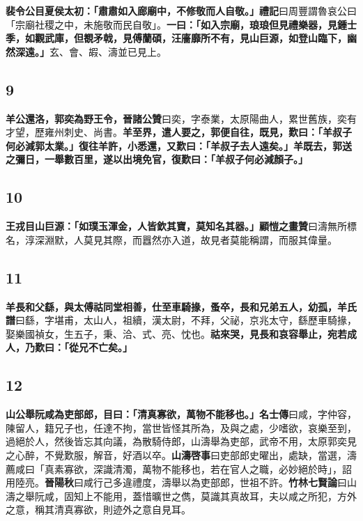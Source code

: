 \textbf{裴令公目夏侯太初：「肅肅如入廊廟中，不修敬而人自敬。」}{\footnotesize \textbf{禮記}曰周豐謂魯哀公曰「宗廟社稷之中，未施敬而民自敬」。}\textbf{一曰：「如入宗廟，琅琅但見禮樂器，見鍾士季，如觀武庫，但覩矛戟，見傅蘭碩，汪廧靡所不有，見山巨源，如登山臨下，幽然深遠。」}{\footnotesize 玄、會、嘏、濤並已見上。}

\subsection*{9}

\textbf{羊公還洛，郭奕為野王令，}{\footnotesize \textbf{晉諸公贊}曰奕，字泰業，太原陽曲人，累世舊族，奕有才望，歷雍州刺史、尚書。}\textbf{羊至界，遣人要之，郭便自往，既見，歎曰：「羊叔子何必減郭太業。」復往羊許，小悉還，又歎曰：「羊叔子去人遠矣。」羊既去，郭送之彌日，一舉數百里，遂以出境免官，復歎曰：「羊叔子何必減顏子。」}

\subsection*{10}

\textbf{王戎目山巨源：「如璞玉渾金，人皆欽其寶，莫知名其器。」}{\footnotesize \textbf{顧愷之畫贊}曰濤無所標名，淳深淵默，人莫見其際，而囂然亦入道，故見者莫能稱謂，而服其偉量。}

\subsection*{11}

\textbf{羊長和父繇，與太傅祜同堂相善，仕至車騎掾，蚤卒，長和兄弟五人，幼孤，}{\footnotesize \textbf{羊氏譜}曰繇，字堪甫，太山人，祖續，漢太尉，不拜，父祕，京兆太守，繇歷車騎掾，娶樂國禎女，生五子，秉、洽、式、亮、忱也。}\textbf{祜來哭，見長和哀容舉止，宛若成人，乃歎曰：「從兄不亡矣。」}

\subsection*{12}

\textbf{山公舉阮咸為吏部郎，目曰：「清真寡欲，萬物不能移也。」}{\footnotesize \textbf{名士傳}曰咸，字仲容，陳留人，籍兄子也，任達不拘，當世皆怪其所為，及與之處，少嗜欲，哀樂至到，過絕於人，然後皆忘其向議，為散騎侍郎，山濤舉為吏部，武帝不用，太原郭奕見之心醉，不覺歎服，解音，好酒以卒。\textbf{山濤啓事}曰吏部郎史曜出，處缺，當選，濤薦咸曰「真素寡欲，深識清濁，萬物不能移也，若在官人之職，必妙絕於時」，詔用陸亮。\textbf{晉陽秋}曰咸行己多違禮度，濤舉以為吏部郎，世祖不許。\textbf{竹林七賢論}曰山濤之舉阮咸，固知上不能用，蓋惜曠世之儁，莫識其真故耳，夫以咸之所犯，方外之意，稱其清真寡欲，則迹外之意自見耳。}

